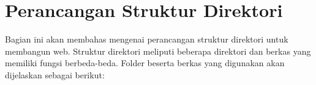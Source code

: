\section{Perancangan Struktur Direktori}
\label{sec:direktori}

Bagian ini akan membahas mengenai perancangan struktur direktori untuk membangun web. Struktur direktori meliputi beberapa direktori dan berkas yang memiliki fungsi berbeda-beda. Folder beserta berkas yang digunakan akan dijelaskan sebagai berikut:


